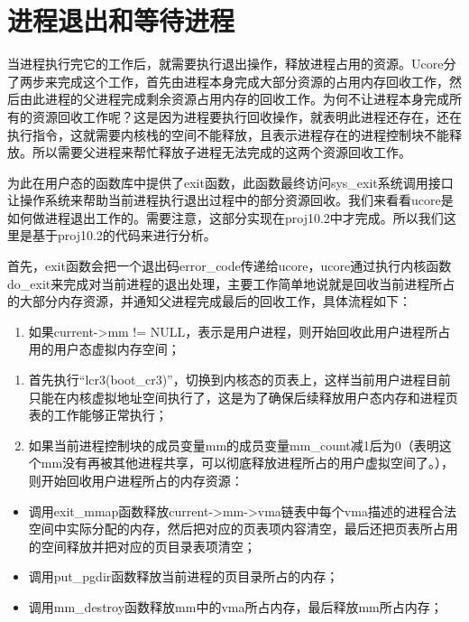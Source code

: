 \section{进程退出和等待进程}\label{ux8fdbux7a0bux9000ux51faux548cux7b49ux5f85ux8fdbux7a0b}

当进程执行完它的工作后，就需要执行退出操作，释放进程占用的资源。Ucore分了两步来完成这个工作，首先由进程本身完成大部分资源的占用内存回收工作，然后由此进程的父进程完成剩余资源占用内存的回收工作。为何不让进程本身完成所有的资源回收工作呢？这是因为进程要执行回收操作，就表明此进程还存在，还在执行指令，这就需要内核栈的空间不能释放，且表示进程存在的进程控制块不能释放。所以需要父进程来帮忙释放子进程无法完成的这两个资源回收工作。

为此在用户态的函数库中提供了exit函数，此函数最终访问sys\_exit系统调用接口让操作系统来帮助当前进程执行退出过程中的部分资源回收。我们来看看ucore是如何做进程退出工作的。需要注意，这部分实现在proj10.2中才完成。所以我们这里是基于proj10.2的代码来进行分析。

首先，exit函数会把一个退出码error\_code传递给ucore，ucore通过执行内核函数do\_exit来完成对当前进程的退出处理，主要工作简单地说就是回收当前进程所占的大部分内存资源，并通知父进程完成最后的回收工作，具体流程如下：

\begin{enumerate}
\def\labelenumi{\arabic{enumi}.}
\tightlist
\item
  如果current-\textgreater{}mm !=
  NULL，表示是用户进程，则开始回收此用户进程所占用的用户态虚拟内存空间；
\end{enumerate}

\begin{enumerate}
\def\labelenumi{\alph{enumi}.}
\item
  首先执行``lcr3(boot\_cr3)''，切换到内核态的页表上，这样当前用户进程目前只能在内核虚拟地址空间执行了，这是为了确保后续释放用户态内存和进程页表的工作能够正常执行；
\item
  如果当前进程控制块的成员变量mm的成员变量mm\_count减1后为0（表明这个mm没有再被其他进程共享，可以彻底释放进程所占的用户虚拟空间了。），则开始回收用户进程所占的内存资源：
\end{enumerate}

\begin{itemize}
\tightlist
\item
  调用exit\_mmap函数释放current-\textgreater{}mm-\textgreater{}vma链表中每个vma描述的进程合法空间中实际分配的内存，然后把对应的页表项内容清空，最后还把页表所占用的空间释放并把对应的页目录表项清空；
\item
  调用put\_pgdir函数释放当前进程的页目录所占的内存；
\item
  调用mm\_destroy函数释放mm中的vma所占内存，最后释放mm所占内存；
\end{itemize}


